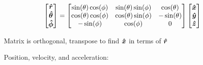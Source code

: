     \begin{align*}
        \begin{bmatrix}
        \e{r}\\
        \e{\theta}\\
        \e{\phi}
        \end{bmatrix}
        &=
        \begin{bmatrix}
        \sin(\theta)\cos(\phi)&\sin(\theta)\sin(\phi)&\cos(\theta)\\
        \cos(\theta)\cos(\phi)&\cos(\theta)\sin(\phi)&-\sin(\theta)\\
        -\sin(\phi)&\cos(\phi)&0
        \end{bmatrix}
        \begin{bmatrix}
        \e{x}\\
        \e{y}\\
        \e{z}
        \end{bmatrix}
    \end{align*}
    \begin{center}
    Matrix is orthogonal, transpose to find $\e{x}$ in terms of $\e{r}$
    \end{center}
    \vspace{0.5 cm}
    Position, velocity, and acceleration:
